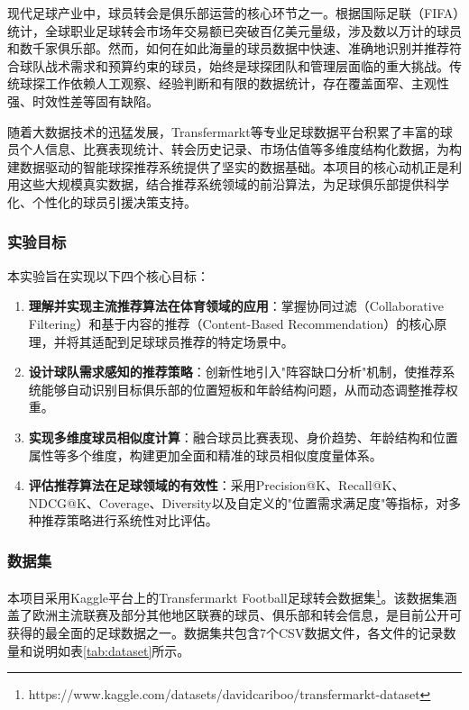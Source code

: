 \documentclass[a4paper]{article}
\begin{document}
现代足球产业中，球员转会是俱乐部运营的核心环节之一。根据国际足联（FIFA）统计，全球职业足球转会市场年交易额已突破百亿美元量级，涉及数以万计的球员和数千家俱乐部。然而，如何在如此海量的球员数据中快速、准确地识别并推荐符合球队战术需求和预算约束的球员，始终是球探团队和管理层面临的重大挑战。传统球探工作依赖人工观察、经验判断和有限的数据统计，存在覆盖面窄、主观性强、时效性差等固有缺陷。

随着大数据技术的迅猛发展，Transfermarkt等专业足球数据平台积累了丰富的球员个人信息、比赛表现统计、转会历史记录、市场估值等多维度结构化数据，为构建数据驱动的智能球探推荐系统提供了坚实的数据基础。本项目的核心动机正是利用这些大规模真实数据，结合推荐系统领域的前沿算法，为足球俱乐部提供科学化、个性化的球员引援决策支持。

\subsubsection{实验目标}

本实验旨在实现以下四个核心目标：

\begin{enumerate}
    \item \textbf{理解并实现主流推荐算法在体育领域的应用}：掌握协同过滤（Collaborative Filtering）和基于内容的推荐（Content-Based Recommendation）的核心原理，并将其适配到足球球员推荐的特定场景中。
    \item \textbf{设计球队需求感知的推荐策略}：创新性地引入"阵容缺口分析"机制，使推荐系统能够自动识别目标俱乐部的位置短板和年龄结构问题，从而动态调整推荐权重。
    \item \textbf{实现多维度球员相似度计算}：融合球员比赛表现、身价趋势、年龄结构和位置属性等多个维度，构建更加全面和精准的球员相似度度量体系。
    \item \textbf{评估推荐算法在足球领域的有效性}：采用Precision@K、Recall@K、NDCG@K、Coverage、Diversity以及自定义的"位置需求满足度"等指标，对多种推荐策略进行系统性对比评估。
\end{enumerate}

\subsubsection{数据集}

本项目采用Kaggle平台上的Transfermarkt Football足球转会数据集\footnote{https://www.kaggle.com/datasets/davidcariboo/transfermarkt-dataset}。该数据集涵盖了欧洲主流联赛及部分其他地区联赛的球员、俱乐部和转会信息，是目前公开可获得的最全面的足球数据之一。数据集共包含7个CSV数据文件，各文件的记录数量和说明如表\ref{tab:dataset}所示。
\end{document}
